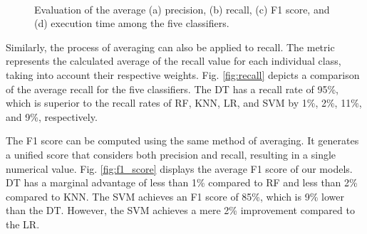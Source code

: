 \documentclass[conference]{IEEEtran}
\begin{document}
\begin{figure}[h]
\centering
{}
\hfill
{}
\\
\hfill
{}
\caption{Evaluation of the average (a) precision, (b) recall, (c) F1 score, and (d) execution time among the five classifiers.}
\label{fig:metrics}
    \vspace{-4mm}
\end{figure}

Similarly, the process of averaging can also be applied to recall. The metric represents the calculated average of the recall value for each individual class, taking into account their respective weights. Fig. \ref{fig:recall} depicts a comparison of the average recall for the five classifiers. The DT has a recall rate of 95\%, which is superior to the recall rates of RF, KNN, LR, and SVM by 1\%, 2\%, 11\%, and 9\%, respectively.

The F1 score can be computed using the same method of averaging. It generates a unified score that considers both precision and recall, resulting in a single numerical value. Fig. \ref{fig:f1_score} displays the average F1 score of our models. DT has a marginal advantage of less than 1\% compared to RF and less than 2\% compared to KNN. The SVM achieves an F1 score of 85\%, which is 9\% lower than the DT. However, the SVM achieves a mere 2\% improvement compared to the LR.
\end{document}
